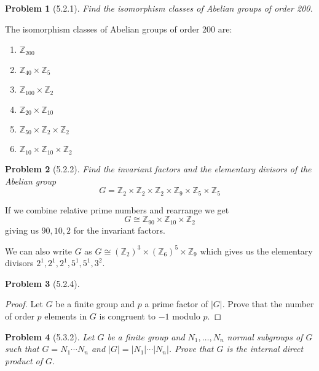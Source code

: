 \documentclass[10pt]{article}
\newcommand{\sk}{\vskip 10mm}
\newcommand{\bb}[1]{\mathbb{#1}}
\theoremstyle{plain}
\newtheorem{problem}{Problem}
\theoremstyle{remark}
\begin{document}
\begin{problem}[5.2.1]
  Find the isomorphism classes of Abelian groups of order 200.
\end{problem}

The isomorphism classes of Abelian groups of order 200 are:
\begin{enumerate}
\item $\bb{Z}_{200}$
\item $\bb{Z}_{40}\times\bb{Z}_{5}$
\item $\bb{Z}_{100}\times\bb{Z}_{2}$
\item $\bb{Z}_{20}\times\bb{Z}_{10}$
\item $\bb{Z}_{50}\times\bb{Z}_{2}\times\bb{Z}_{2}$
\item $\bb{Z}_{10}\times\bb{Z}_{10}\times\bb{Z}_{2}$
\end{enumerate}

\sk

\begin{problem}[5.2.2]
  Find the invariant factors and the elementary divisors of the Abelian
  group
  \[ G=\bb{Z}_2\times\bb{Z}_2\times\bb{Z}_2\times\bb{Z}_9\times\bb{Z}_5\times\bb{Z}_5\]
\end{problem}

If we combine relative prime numbers and rearrange we get
\[ G\cong \bb{Z}_{90}\times \bb{Z}_{10}\times \bb{Z}_2\]
giving us $90,10,2$ for the invariant factors.

We can also write $G$ as
$G\cong (\bb{Z}_2)^3\times(\bb{Z}_6)^5\times\bb{Z}_9$
which gives us the elementary divisors
$2^1,2^1,2^1,5^1,5^1,3^2$.

\sk

\begin{problem}[5.2.4]
  
\end{problem}

\begin{proof}
  Let $G$ be a finite group and $p$ a prime factor of $|G|$. Prove that the
  number of order $p$ elements in $G$ is congruent to $-1$ modulo $p$.
\end{proof}

\sk

\begin{problem}[5.3.2]
  Let $G$ be a finite group and $N_1,\ldots, N_n$ normal subgroups of $G$ such
  that $G=N_1\cdots N_n$ and $|G|=|N_1|\cdots|N_n|$. Prove that $G$ is the internal direct
  product of $G$.
\end{problem}
\end{document}
